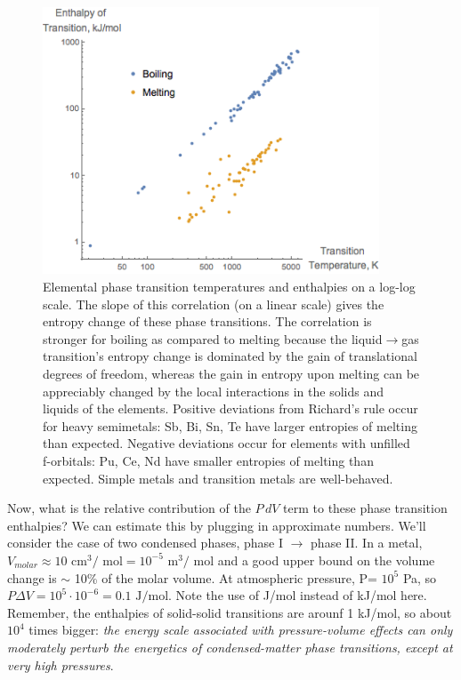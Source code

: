 \documentclass[12pt]{article}
\begin{document}
\begin{figure}[h]
\centering
\includegraphics[width = 10cm]{Trouton_and_Richards_rules.png}
\caption{Elemental phase transition temperatures and enthalpies on a log-log scale. The slope of this correlation (on a linear scale) gives the entropy change of these phase transitions. The correlation is stronger for boiling as compared to melting because the liquid$\to$gas transition's entropy change is dominated by the gain of translational degrees of freedom, whereas the gain in entropy upon melting can be appreciably changed by the local interactions in the solids and liquids of the elements. Positive deviations from Richard's rule occur for heavy semimetals: Sb, Bi, Sn, Te have larger entropies of melting than expected. Negative deviations occur for elements with unfilled f-orbitals: Pu, Ce, Nd have smaller entropies of melting than expected. Simple metals and transition metals are well-behaved.}
\label{Trouton_Richard}
\end{figure}

Now, what is the relative contribution of the $P\, dV$ term to these phase transition enthalpies?  We can estimate this by plugging in approximate numbers. We'll consider the case of two condensed phases, phase I $\rightarrow$ phase II.  In a metal, $V_{molar} \approx 10 \text{ cm}^3\text{/ mol}=10^{-5} \text{ m}^3\text{/ mol}$ and a good upper bound on the volume change is $\sim$ 10\% of the molar volume.  At atmospheric pressure, P\degree = $10^5$ Pa, so $P \Delta V = 10^5 \cdot 10^{-6} = 0.1 \text{ J/mol}$. Note the use of J/mol instead of kJ/mol here. Remember, the enthalpies of solid-solid transitions are arounf 1 kJ/mol, so about $10^4$ times bigger: \emph{the energy scale associated with pressure-volume effects can only moderately perturb the energetics of condensed-matter phase transitions, except at very high pressures}.
\end{document}

